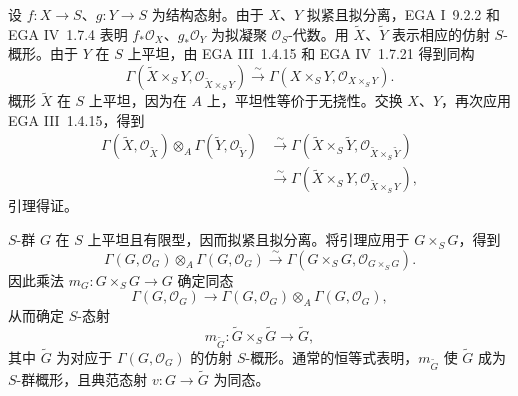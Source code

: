 
设 \(f:X\to S\)、\(g:Y\to S\) 为结构态射。由于 \(X\)、\(Y\) 拟紧且拟分离，EGA I~9.2.2 和 EGA IV~1.7.4 表明 \(f_*\mathcal O_X\)、\(g_*\mathcal O_Y\) 为拟凝聚 \(\mathcal O_S\)-代数。用 \(\widetilde X\)、\(\widetilde Y\) 表示相应的仿射 \(S\)-概形。由于 \(Y\) 在 \(S\) 上平坦，由 EGA III~1.4.15 和 EGA IV~1.7.21 得到同构
\[
 \Gamma(\widetilde X\times_SY,
        \mathcal O_{\widetilde X\times_SY})
 \xrightarrow{\sim}
 \Gamma(X\times_SY,\mathcal O_{X\times_SY}).
\]
概形 \(\widetilde X\) 在 \(S\) 上平坦，因为在 \(A\) 上，平坦性等价于无挠性。交换 \(X\)、\(Y\)，再次应用 EGA III~1.4.15，得到
\[
\begin{aligned}
 \Gamma(\widetilde X,\mathcal O_{\widetilde X})
 \otimes_A\Gamma(\widetilde Y,\mathcal O_{\widetilde Y})
 &\xrightarrow{\sim}
 \Gamma(\widetilde X\times_S\widetilde Y,
        \mathcal O_{\widetilde X\times_S\widetilde Y})\\
 &\xrightarrow{\sim}
 \Gamma(\widetilde X\times_SY,
        \mathcal O_{\widetilde X\times_SY}),
\end{aligned}
\]
引理得证。

\(S\)-群 \(G\) 在 \(S\) 上平坦且有限型，因而拟紧且拟分离。将引理应用于 \(G\times_SG\)，得到
\[
 \Gamma(G,\mathcal O_G)\otimes_A\Gamma(G,\mathcal O_G)
 \xrightarrow{\sim}
 \Gamma(G\times_SG,\mathcal O_{G\times_SG}).
\]
因此乘法 \(m_G:G\times_SG\to G\) 确定同态
\[
 \Gamma(G,\mathcal O_G)\longrightarrow
 \Gamma(G,\mathcal O_G)\otimes_A\Gamma(G,\mathcal O_G),
\]
从而确定 \(S\)-态射
\[
  m_{\widetilde G}:\widetilde G\times_S\widetilde G
  \longrightarrow\widetilde G,
\]
其中 \(\widetilde G\) 为对应于 \(\Gamma(G,\mathcal O_G)\) 的仿射 \(S\)-概形。通常的恒等式表明，\(m_{\widetilde G}\) 使 \(\widetilde G\) 成为 \(S\)-群概形，且典范态射 \(v:G\to\widetilde G\) 为同态。



